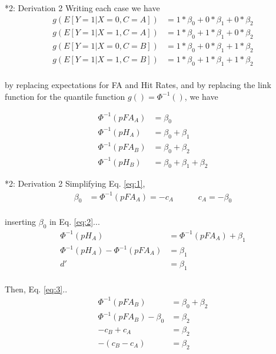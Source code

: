 \documentclass[10pt]{beamer}
\begin{document}
\begin{frame}{*2: Derivation 2}
Writing each case we have 
\begin{align*}
g(E[Y=1| X=0, C=A]) & = 1* \beta_0 + 0 * \beta_1 + 0* \beta_2 \\
g(E[Y=1| X=1, C=A]) & = 1* \beta_0 + 1 * \beta_1 + 0* \beta_2 \\
g(E[Y=1| X=0, C=B]) & = 1* \beta_0 + 0 * \beta_1 + 1* \beta_2 \\
g(E[Y=1| X=1, C=B]) & = 1* \beta_0 + 1 * \beta_1 + 1* \beta_2 \\
\end{align*}

by replacing expectations for FA and Hit Rates, and by replacing the link function for the quantile function $g() = \Phi^{-1}()$, we have

\begin{align}
\Phi^{-1}(pFA_{A}) & = \beta_0 \label{eq:1}\\
\Phi^{-1}(pH_{A}) & = \beta_0 + \beta_1 \label{eq:2}\\
\Phi^{-1}(pFA_{B}) & = \beta_0 + \beta_2  \label{eq:3}\\
\Phi^{-1}(pH_{B}) & = \beta_0 + \beta_1 + \beta_2 \label{eq:4}
\end{align}
\end{frame}

\begin{frame}{*2: Derivation 2}
Simplifying Eq. \autoref{eq:1}, 
\begin{align*}
\beta_0 & = \Phi^{-1}(pFA_{A}) = -c_A \quad \quad \quad c_A = -\beta_0\\
\end{align*}

inserting $\beta_0$ in Eq. \autoref{eq:2}...
\begin{align*}
\Phi^{-1}(pH_{A}) & = \Phi^{-1}(pFA_{A}) + \beta_1\\
\Phi^{-1}(pH_{A}) - \Phi^{-1}(pFA_{A}) & =  \beta_1\\
d' & = \beta_1 \\
\end{align*}

Then, Eq. \autoref{eq:3}..
\begin{align*}
\Phi^{-1}(pFA_{B}) & = \beta_0  + \beta_2 \\
\Phi^{-1}(pFA_{B}) - \beta_0 & =  \beta_2 \\
- c_B + c_A & =  \beta_2 \\
- (c_B - c_A) & =  \beta_2 \\
\end{align*}
\end{frame}
\end{document}

